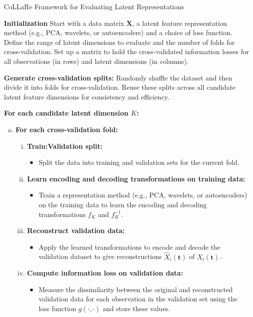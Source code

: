 \begin{algorithm}
\caption{CoLLaRe Framework for Evaluating Latent Representations}
\begin{algorithmic}[1]

\State \textbf{Initialization} Start with a data matrix $\mathbf{X}$, a latent feature representation method (e.g., PCA, wavelets, or autoencoders) and a choice of loss function. Define the range of latent dimensions to evaluate and the number of folds for cross-validation. Set up a matrix to hold the cross-validated information losses for all observations (in rows) and latent dimensions (in columns).

\State \textbf{Generate cross-validation splits:} Randomly shuffle the dataset and then divide it into folds for cross-validation. Reuse these splits across all candidate latent feature dimensions for consistency and efficiency.

\State \textbf{For each candidate latent dimension $K$:}
\begin{enumerate}[a.]
    \item \textbf{For each cross-validation fold:}
    \begin{enumerate}[i.]
        \item \textbf{Train:Validation split:} 
        \begin{itemize}
            \item Split the data into training and validation sets for the current fold.
        \end{itemize}
        \item \textbf{Learn encoding and decoding transformations on training data:}
        \begin{itemize}
            \item Train a representation method (e.g., PCA, wavelets, or autoencoders) on the training data to learn the encoding and decoding transformations $f_K$ and $f^{-1}_K$.
        \end{itemize}
        \item \textbf{Reconstruct validation data:}
        \begin{itemize}
            \item Apply the learned transformations to encode and decode the validation dataset to give reconstructions $\widehat{X}_i (\mathbf{t})$ of $X_i (\mathbf{t})$.
        \end{itemize}
        \item \textbf{Compute information loss on validation data:}
        \begin{itemize}
            \item Measure the dissimilarity between the original and reconstructed validation data for each observation in the validation set using the loss function $g(\cdot, \cdot)$ and store these values.
        \end{itemize}
    \end{enumerate}
\end{enumerate}


\end{algorithmic}
\end{algorithm}
